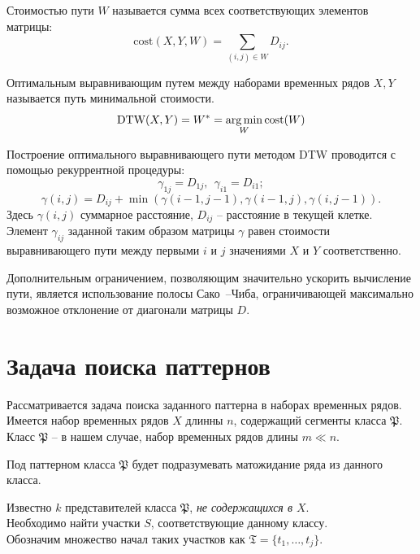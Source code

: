 \documentclass[12pt,twoside]{article}
\begin{document}
        \begin{Def}
            Стоимостью пути $W$ называется сумма всех соответствующих элементов матрицы:
            $$\text{cost}(X, Y, W) = \sum\limits_{(i, j)\in W} D_{ij}.$$
        \end{Def}
        \begin{Def}
            Оптимальным выравнивающим путем между наборами временных рядов $X, Y$ называется путь минимальной стоимости. $$\text{DTW}(X, Y) = W^* = \argmin\limits_{W}\text{cost}(W)$$
        \end{Def}

        Построение оптимального выравнивающего пути методом DTW проводится с помощью рекуррентной процедуры:
        $$\gamma_{1j} = D_{1j},\ \ \gamma_{i1} = D_{i1};$$
        $$\gamma(i, j) = D_{ij} + \min({\gamma(i-1, j-1), \gamma(i-1, j), \gamma(i, j-1)}).$$
        Здесь $\gamma(i, j)$ суммарное расстояние, $D_{ij}$ \--- расстояние в текущей клетке. Элемент $\gamma_{ij}$ заданной таким образом матрицы $\gamma$ равен стоимости выравнивающего пути между первыми $i$ и $j$ значениями $X$ и $Y$ соответственно.

        
        Дополнительным ограничением, позволяющим значительно ускорить вычисление пути, является использование полосы Сако~--Чиба, ограничивающей максимально возможное отклонение от диагонали матрицы $D$.
                
    \label{sec:search}\section{Задача поиска паттернов}
        
        Рассматривается задача поиска заданного паттерна в наборах временных рядов.
        Имеется набор временных рядов $X$ длинны $n$, содержащий сегменты класса $\mathfrak{P}$.
        Класс $\mathfrak{P}$ \--- в нашем случае, набор временных рядов длины $m \ll n$. \\
        \begin{Def}{}
            Под паттерном класса $\mathfrak{P}$ будет подразумевать матожидание ряда из данного класса.
        \end{Def}
        
        Известно $k$ представителей класса $\mathfrak{P}$, \textit{не содержащихся в $X$}. \\
        Необходимо найти участки $S$, соответствующие данному классу. \\
        Обозначим множество начал таких участков как $\mathfrak{T} = \{t_1, \dots, t_j \}$.
\end{document}
